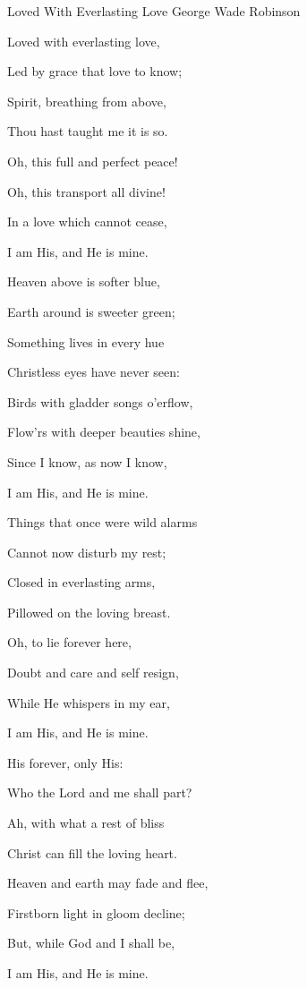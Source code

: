 \documentclass[12pt]{book}
\begin{document}
\begin{song}{Loved With Everlasting Love}{}
  {\SBPubDom}
  {George Wade Robinson}
  {}
  {}

  \begin{SBVerse}
    Loved with everlasting love,

    Led by grace that love to know;

    Spirit, breathing from above,

    Thou hast taught me it is so.

    Oh, this full and perfect peace!

    Oh, this transport all divine!

    In a love which cannot cease,

    I am His, and He is mine.
  \end{SBVerse}

  \begin{SBVerse}
    Heaven above is softer blue,

    Earth around is sweeter green;

    Something lives in every hue

    Christless eyes have never seen:

    Birds with gladder songs o'erflow,

    Flow'rs with deeper beauties shine,

    Since I know, as now I know,

    I am His, and He is mine.
  \end{SBVerse}

  \begin{SBVerse}
    Things that once were wild alarms

    Cannot now disturb my rest;

    Closed in everlasting arms,

    Pillowed on the loving breast.

    Oh, to lie forever here,

    Doubt and care and self resign,

    While He whispers in my ear,

    I am His, and He is mine.
  \end{SBVerse}

  \begin{SBVerse}
    His forever, only His:

    Who the Lord and me shall part?

    Ah, with what a rest of bliss

    Christ can fill the loving heart.

    Heaven and earth may fade and flee,

    Firstborn light in gloom decline;

    But, while God and I shall be,

    I am His, and He is mine.
  \end{SBVerse}
\end{song}
\end{document}
